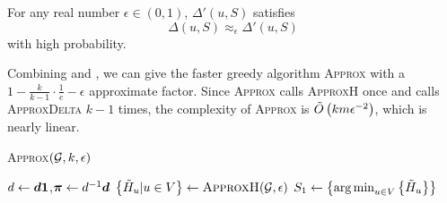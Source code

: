 \documentclass[sigconf]{acmart}
\begin{document}
\begin{lemma}\label{lem:approx-marginest}
  For any real number \(\epsilon\in(0,1)\), \(\Delta'(u,S)\) satisfies
  \[\Delta(u,S)\approx_\epsilon \Delta'(u,S)\]
  with high probability.
\end{lemma}


Combining  and , we can give the faster greedy algorithm \textsc{Approx} with a \(1-\frac{k}{k-1}\cdot\frac{1}{e}-\epsilon\) approximate factor.
Since \textsc{Approx} calls \textsc{ApproxH} once and calls \textsc{ApproxDelta} \(k-1\) times, the complexity of \textsc{Approx} is \(\tilde{O}\left( km\epsilon^{-2} \right)\), which is nearly linear.

\begin{algorithm}
  \caption{\textsc{Approx}\((\mathcal{G},k,\epsilon)\)}
  \label{algo:approx}
  \(d\gets\boldsymbol{d}\boldsymbol{1}\),\(\boldsymbol{\pi}\gets d^{-1}\boldsymbol{d}\)\;
  \(\left\{\tilde{H}_u|u\in V  \right\}\gets\textsc{ApproxH}(\mathcal{G},\epsilon)\)\;
  \(S_1\gets\left\{\operatorname*{arg\,min}_{u\in V}\left\{\tilde{H}_u \right\} \right\}\)\;
\end{algorithm}
\end{document}

